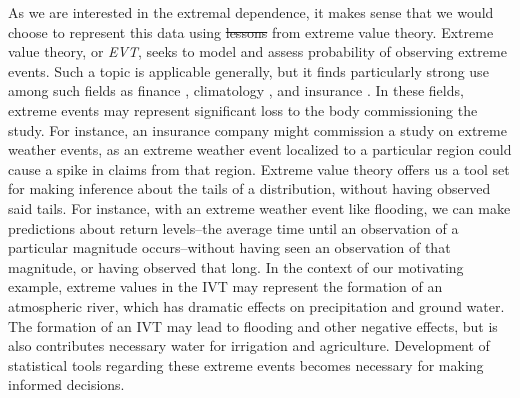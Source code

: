 As we are interested in the extremal dependence, it makes sense that we would choose to represent
  this data using \st{lessons}  from extreme value theory.  Extreme value theory, or
  \emph{EVT}, seeks to model and assess probability of observing extreme events.  Such a topic is
  applicable generally, but it finds particularly strong use among such fields as finance \citep{allen2013},
  climatology \citep{trepanier2018}, and insurance \citep{beirlant1994}.  In these fields, extreme
  events may represent significant loss to the body commissioning the study.  For instance, an
  insurance company might commission a study on extreme weather events, as an extreme weather event
  localized to a particular region could cause a spike in claims from that region.  Extreme value
  theory offers us a tool set for making inference about the tails of a distribution, without having
  observed said tails.  For
  instance, with an extreme weather event like flooding, we can make predictions about return
  levels--the average time until an observation of a particular magnitude occurs--without having seen
  an observation of that magnitude, or having observed that long.  In the context of our motivating
  example, extreme values in the IVT may represent the formation of an atmospheric river, which has
  dramatic effects on precipitation and ground water.  The formation of an IVT may lead to flooding
  and other negative effects, but is also contributes necessary water for irrigation and agriculture.
  Development of statistical tools regarding these extreme events becomes necessary for making informed
  decisions.

